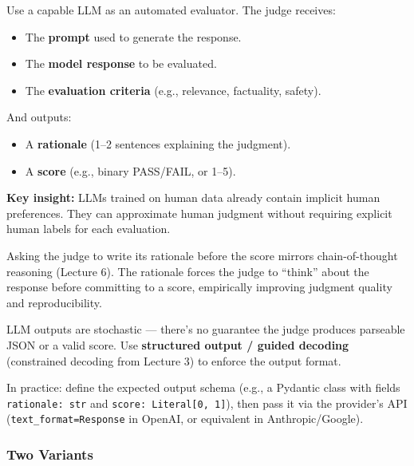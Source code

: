 \documentclass[11pt, a4paper]{article}
\begin{document}
\begin{defbox}
Use a capable LLM as an automated evaluator. The judge receives:
\begin{itemize}[leftmargin=1.5em]
  \item The \textbf{prompt} used to generate the response.
  \item The \textbf{model response} to be evaluated.
  \item The \textbf{evaluation criteria} (e.g., relevance, factuality, safety).
\end{itemize}
And outputs:
\begin{itemize}[leftmargin=1.5em]
  \item A \textbf{rationale} (1--2 sentences explaining the judgment).
  \item A \textbf{score} (e.g., binary PASS/FAIL, or 1--5).
\end{itemize}
\textbf{Key insight:} LLMs trained on human data already contain implicit human preferences. They can approximate human judgment without requiring explicit human labels for each evaluation.
\end{defbox}

\begin{notebox}
Asking the judge to write its rationale before the score mirrors chain-of-thought reasoning (Lecture 6). The rationale forces the judge to ``think'' about the response before committing to a score, empirically improving judgment quality and reproducibility.
\end{notebox}

\begin{defbox}
LLM outputs are stochastic --- there's no guarantee the judge produces parseable JSON or a valid score. Use \textbf{structured output / guided decoding} (constrained decoding from Lecture 3) to enforce the output format.

In practice: define the expected output schema (e.g., a Pydantic class with fields \texttt{rationale: str} and \texttt{score: Literal[0, 1]}), then pass it via the provider's API (\texttt{text\_format=Response} in OpenAI, or equivalent in Anthropic/Google).
\end{defbox}

\subsubsection{Two Variants}
\end{document}
